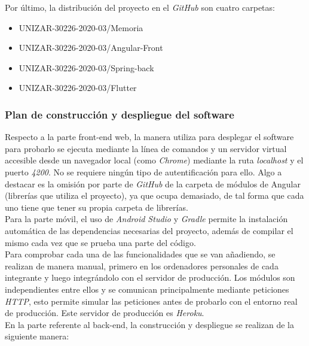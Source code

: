 \documentclass{article}
\begin{document}
\newpage
Por último, la distribución del proyecto en el \textit{GitHub} son cuatro carpetas:
\begin{itemize}
	\item UNIZAR-30226-2020-03/Memoria
	\item UNIZAR-30226-2020-03/Angular-Front
	\item UNIZAR-30226-2020-03/Spring-back
	\item UNIZAR-30226-2020-03/Flutter
\end{itemize}

\newpage
\subsubsection{Plan de construcción y despliegue del software}
Respecto a la parte front-end web, la manera utiliza para desplegar el software para probarlo se ejecuta mediante la línea de comandos y un servidor virtual accesible desde un navegador local (como \textit{Chrome}) mediante la ruta \textit{localhost} y el puerto \textit{4200}. No se requiere ningún tipo de autentificación para ello.
Algo a destacar es la omisión por parte de \textit{GitHub} de la carpeta de módulos de Angular (librerías que utiliza el proyecto), ya que ocupa demasiado, de tal forma que cada uno tiene que tener su propia carpeta de librerías.\\
\hfill \break
Para la parte móvil, el uso de \textit{Android Studio} y \textit{Gradle} permite la instalación automática de las dependencias necesarias del proyecto, además de compilar el mismo cada vez que se prueba una parte del código.\\
\hfill \break
Para comprobar cada una de las funcionalidades que se van añadiendo, se realizan de manera manual, primero en los ordenadores personales de cada integrante y luego integrándolo con el servidor de producción. 
Los módulos son independientes entre ellos y se comunican principalmente mediante peticiones \textit{HTTP}, esto permite simular las peticiones antes de probarlo con el entorno real de producción. 
Este servidor de producción es \textit{Heroku}. \\
\hfill \break
En la parte referente al back-end, la construcción y despliegue se realizan de la siguiente manera:
\end{document}
